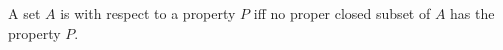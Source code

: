 A set $A$ is  with respect to a property $P$ iff no proper closed subset of $A$ has the property $P$.
